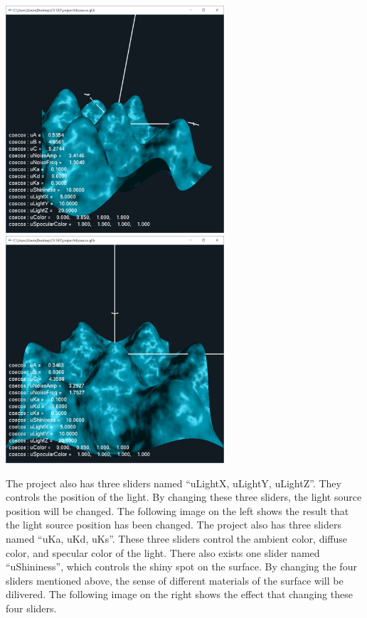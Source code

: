\documentclass[letterpaper,14pt,titlepage,fleqn]{article}
\begin{document}
\begin{center}
	\includegraphics[width=3.2in]{bump1.jpg}
	\includegraphics*[width=3.2in]{bump2.jpg}
\end{center}
The project also has three sliders named ``uLightX, uLightY, uLightZ''. They controls the position of the light. By changing these three sliders, the light source position will be changed. The following image on the left shows the result that the light source position has been changed. The project also has three sliders named ``uKa, uKd, uKs''. These three sliders control the ambient color, diffuse color, and specular color of the light. There also exists one slider named ``uShininess'', which controls the shiny spot on the surface. By changing the four sliders mentioned above, the sense of different materials of the surface will be dilivered. The following image on the right shows the effect that changing these four sliders.
\end{document}
